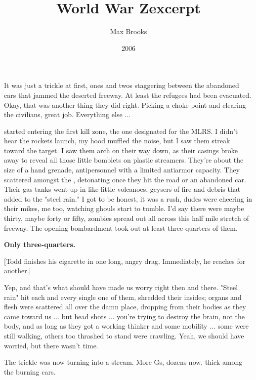 \documentclass[10pt,a4paper]{article}
\newcommand{\glos}[3]{\dotuline{#1}\marginpar{\scriptsize\textit{#3} #2}}
\newcommand{\subtitle}[1]{\vspace{10pt}\newline\normalsize\plantin #1}
\begin{document}
\title{World War Z\subtitle{excerpt}}
\date{2006}
\author{Max Brooks}
\maketitle
    
\thispagestyle{plain}
\setcounter{page}{1}
\linenumbers
\noindent It was just a trickle at first, ones and twos staggering between the abandoned cars that jammed the deserted freeway. At least the refugees had been evacuated. Okay, that was another thing they did right. Picking a choke point and clearing the civilians, great job. Everything else ...

\glos{Zack}{Zombies}{sb.} started entering the first kill zone, the one designated for the MLRS. I didn't hear the rockets launch, my hood muffled the noise, but I saw them streak toward the target. I saw them arch on their way down, as their casings broke away to reveal all those little bomblets on plastic streamers. They're about the size of a hand grenade, antipersonnel with a limited antiarmor capacity. They scattered amongst the \glos{Gs}{Zombies}{sb.}, detonating once they hit the road or an abandoned car. Their gas tanks went up in like little volcanoes, geysers of fire and debris that added to the "steel rain." I got to be honest, it was a rush, dudes were cheering in their mikes, me too, watching ghouls start to tumble. I'd say there were maybe thirty, maybe forty or fifty, zombies spread out all across this half mile stretch of freeway. The opening bombardment took out at least three-quarters of them.

\textbf{Only three-quarters.}

[Todd finishes his cigarette in one long, angry drag. Immediately, he reaches for another.]

Yep, and that's what should have made us worry right then and there. "Steel rain" hit each and every single one of them, shredded their insides; organs and flesh were scattered all over the damn place, dropping from their bodies as they came toward us ... but head shots ... you're trying to destroy the brain, not the body, and as long as they got a working thinker and some mobility ... some were still walking, others too thrashed to stand were crawling. Yeah, we should have worried, but there wasn't time.

The trickle was now turning into a stream. More Gs, dozens now, thick among the burning cars.
\end{document}
